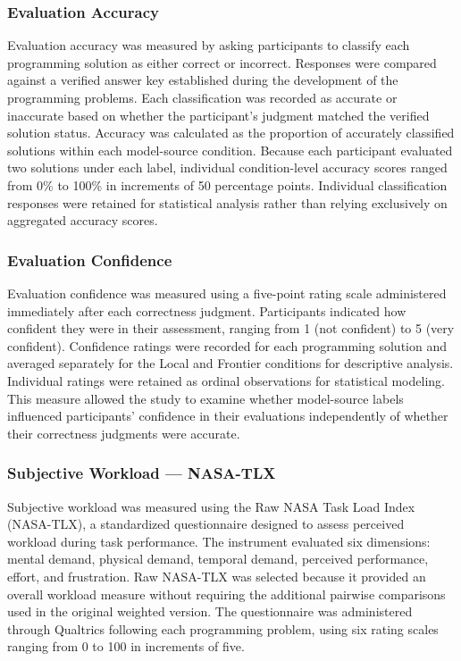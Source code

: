 \documentclass[manuscript,review]{acmart}
\begin{document}
\subsubsection{Evaluation Accuracy}

Evaluation accuracy was measured by asking participants to classify each programming solution as either correct or incorrect. Responses were compared against a verified answer key established during the development of the programming problems. Each classification was recorded as accurate or inaccurate based on whether the participant's judgment matched the verified solution status. Accuracy was calculated as the proportion of accurately classified solutions within each model-source condition. Because each participant evaluated two solutions under each label, individual condition-level accuracy scores ranged from 0\% to 100\% in increments of 50 percentage points. Individual classification responses were retained for statistical analysis rather than relying exclusively on aggregated accuracy scores.

\subsubsection{Evaluation Confidence}

Evaluation confidence was measured using a five-point rating scale administered immediately after each correctness judgment. Participants indicated how confident they were in their assessment, ranging from 1 (not confident) to 5 (very confident). Confidence ratings were recorded for each programming solution and averaged separately for the Local and Frontier conditions for descriptive analysis. Individual ratings were retained as ordinal observations for statistical modeling. This measure allowed the study to examine whether model-source labels influenced participants' confidence in their evaluations independently of whether their correctness judgments were accurate.

\subsubsection{Subjective Workload --- NASA-TLX}

Subjective workload was measured using the Raw NASA Task Load Index (NASA-TLX), a standardized questionnaire designed to assess perceived workload during task performance. The instrument evaluated six dimensions: mental demand, physical demand, temporal demand, perceived performance, effort, and frustration. Raw NASA-TLX was selected because it provided an overall workload measure without requiring the additional pairwise comparisons used in the original weighted version. The questionnaire was administered through Qualtrics following each programming problem, using six rating scales ranging from 0 to 100 in increments of five.
\end{document}
